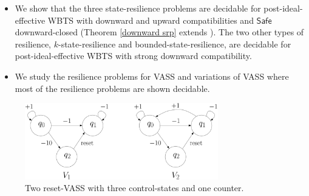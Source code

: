 \documentclass[runningheads]{llncs}
\newcommand{\post}{\textsf{post}}
\newcommand{\Safe}{\textsf{Safe}}
\begin{document}
\begin{itemize}
\item We show that the three state-resilience problems are decidable for post-ideal-effective WBTS with downward and upward compatibilities and $\Safe$ downward-closed (Theorem \ref{downward srp} extends \cite[Theorem 1]{DBLP:journals/corr/PrasadZ16}).
The two other types of resilience, {$k$-state-resilience} and {bounded-state-resilience}, are decidable for post-ideal-effective WBTS with strong downward compatibility.
%
%
%
\item We study the resilience problems for VASS and variations of VASS where most of the resilience problems are shown decidable.
\end{itemize}




\iffalse
 \begin{center}
	\begin{figure}
			\hspace{0.8cm}
\includegraphics[width=0.75\textwidth]{FigureCD}
	\caption{Two reset-VASS with three control-states and one counter.}
					\label{r-V}
	\end{figure}
\end{center}
\end{document}
